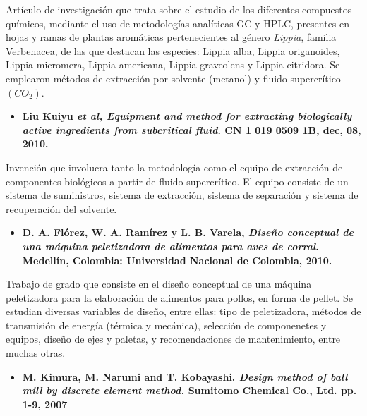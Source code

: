 \noindent
\justify

Art\'iculo de investigaci\'on que trata sobre el estudio de los diferentes compuestos qu\'imicos, mediante el uso de metodolog\'ias anal\'iticas GC y HPLC, presentes en hojas y ramas de plantas arom\'aticas pertenecientes al g\'enero \textit{Lippia}, familia Verbenacea, de las que destacan las especies: Lippia alba, Lippia origanoides, Lippia micromera, Lippia americana, Lippia graveolens y Lippia citridora. Se emplearon m\'etodos de extracci\'on por solvente (metanol) y fluido supercr\'itico $\left(CO_2 \right)$.

\begin{itemize}
	\item{\textbf{Liu Kuiyu \textit{et al, Equipment and method for extracting biologically active ingredients from subcritical fluid}. CN 1 019 0509 1B, dec, 08, 2010.}}
\end{itemize}

\noindent
\justify

Invenci\'on que involucra tanto la metodolog\'ia como el equipo de extracci\'on de componentes biol\'ogicos a partir de fluido supercr\'itico. El equipo consiste de un sistema de suministros, sistema de extracci\'on, sistema de separaci\'on y sistema de recuperaci\'on del solvente.

\begin{itemize}
	\item{\textbf{D. A. Fl\'orez, W. A. Ram\'irez y L. B. Varela, \textit{Dise\~no conceptual de una m\'aquina peletizadora de alimentos para aves de corral}. Medell\'in, Colombia: Universidad Nacional de Colombia, 2010.}}
\end{itemize}

\noindent
\justify

Trabajo de grado que consiste en el dise\~no conceptual de una m\'aquina peletizadora para la elaboraci\'on de alimentos para pollos, en forma de pellet. Se estudian diversas variables de dise\~no, entre ellas: tipo de peletizadora, m\'etodos de transmisi\'on de energ\'ia (t\'ermica y mec\'anica), selecci\'on de componenetes y equipos, dise\~no de ejes y paletas, y recomendaciones de mantenimiento, entre muchas otras. 

\begin{itemize}
	\item{\textbf{M. Kimura, M. Narumi and T. Kobayashi. \textit{Design method of ball mill by discrete element method.} Sumitomo Chemical Co., Ltd. pp. 1-9, 2007}}
\end{itemize}

